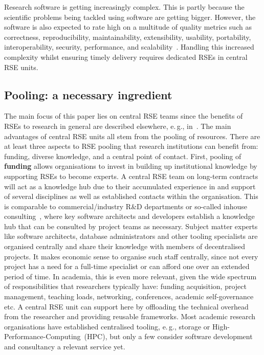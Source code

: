 \documentclass[a4paper]{article}
\newcommand*{\eg}{e.\,g.,\xspace}
\begin{document}
Research software is getting increasingly complex.
This is partly because the scientific problems being tackled using software are getting bigger.
However, the software is also expected to rate high on a multitude of quality metrics such as correctness, reproducibility, maintainability, extensibility, usability, portability, interoperability, security, performance, and scalability~\autocite[Chapter 16]{Schulmeyer2008}.
Handling this increased complexity whilst ensuring timely delivery requires dedicated RSEs in central RSE units.

\subsection{Pooling: a necessary ingredient}
\label{subsec:pooling}
The main focus of this paper lies on central RSE teams since the benefits of RSEs to research in general are described elsewhere, \eg{} in~\autocite{Anzt2021}.
The main advantages of central RSE units all stem from the pooling of resources.
There are at least three aspects to RSE pooling that research institutions can benefit from: funding, diverse knowledge, and a central point of contact.
First, pooling of \textbf{funding} allows organisations to invest in building up institutional knowledge by supporting RSEs to become experts.
A central RSE team on long-term contracts will act as a knowledge hub due to their accumulated experience in and support of several disciplines as well as established contacts within the organisation.
This is comparable to commercial/industry R\&D departments or so-called inhouse consulting~\autocite{Grima_2011}, where key software architects and developers establish a knowledge hub that can be consulted by project teams as necessary.
Subject matter experts like software architects, database administrators and other tooling specialists are organised centrally and share their knowledge with members of decentralised projects.
It makes economic sense to organise such staff centrally, since not every project has a need for a full-time specialist or can afford one over an extended period of time.
In academia, this is even more relevant, given the wide spectrum of responsibilities that researchers typically have: funding acquisition, project management, teaching loads, networking, conferences, academic self-governance etc.
A central RSE unit can support here by offloading the technical overhead from the researcher and providing reusable frameworks.
Most academic research organisations have established centralised tooling, \eg{} storage or High-Performance-Computing\ (HPC), but only a few consider software development and consultancy a relevant service yet.
\end{document}
